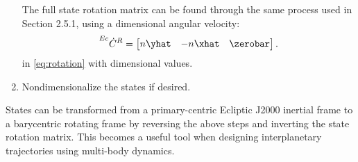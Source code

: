 \begin{enumerate}
            The full state rotation matrix can be found through the same process used in Section
            2.5.1, using a dimensional angular velocity:
            \begin{equation}
                \prescript{Ec}{}{\dot{C}}^{R}=\begin{bmatrix}   n\yhat  &   -n\xhat &   \zerobar    \end{bmatrix}.
                \label{eq:eclipticvelocityrotation}
            \end{equation}
            in \cref{eq:rotation} with dimensional values.
    \item   Nondimensionalize the states if desired.
\end{enumerate}

States can be transformed from a primary-centric Ecliptic J2000 inertial frame to a barycentric
rotating frame by reversing the above steps and inverting the state rotation matrix. This
becomes a useful tool when designing interplanetary trajectories using multi-body dynamics.
